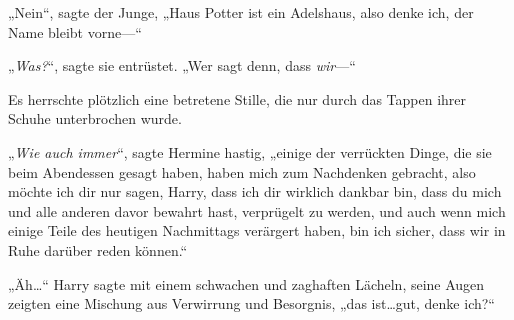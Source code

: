 „Nein“, sagte der Junge, „Haus Potter ist ein Adelshaus, also denke ich, der Name bleibt vorne—“

„\emph{Was?}“, sagte sie entrüstet. „Wer sagt denn, dass \emph{wir}—“

Es herrschte plötzlich eine betretene Stille, die nur durch das Tappen ihrer Schuhe unterbrochen wurde.

„\emph{Wie auch immer}“, sagte Hermine hastig, „einige der verrückten Dinge, die sie beim Abendessen gesagt haben, haben mich zum Nachdenken gebracht, also möchte ich dir nur sagen, Harry, dass ich dir wirklich dankbar bin, dass du mich und alle anderen davor bewahrt hast, verprügelt zu werden, und auch wenn mich einige Teile des heutigen Nachmittags verärgert haben, bin ich sicher, dass wir in Ruhe darüber reden können.“

„Äh…“ Harry sagte mit einem schwachen und zaghaften Lächeln, seine Augen zeigten eine Mischung aus Verwirrung und Besorgnis, „das ist…gut, denke ich?“


